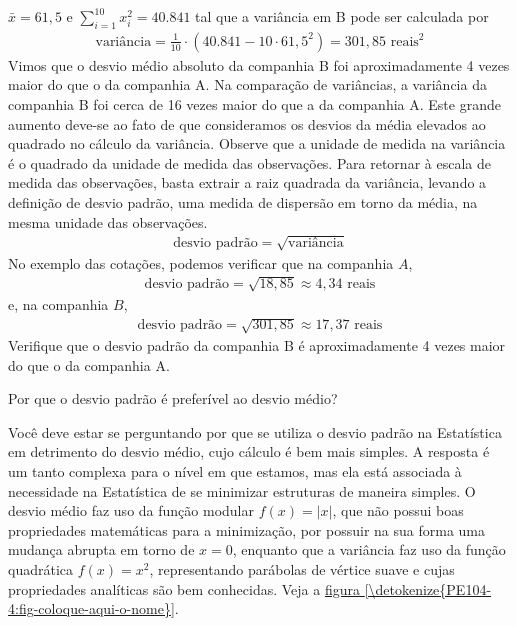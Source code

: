 {{{\(\bar{x}=61,5\) e \(\displaystyle{\sum^{10}_{i=1}} x^2_i=40.841\) tal que a variância em B pode ser calculada por
\begin{equation*}
\begin{split}\text{variância}=\frac{1}{10}\cdot (40.841-10\cdot 61,5^2)=301,85\text{ reais}^2\end{split}
\end{equation*}
Vimos que o desvio médio absoluto da companhia B foi aproximadamente 4 vezes maior do que o da companhia A. Na comparação de variâncias, a variância da companhia B foi cerca de 16 vezes maior do que a da companhia A. Este grande aumento deve-se ao fato de que consideramos os desvios da média elevados ao quadrado no cálculo da variância. Observe que a unidade de medida na variância é o quadrado da unidade de medida das observações. Para retornar à escala de medida das observações, basta extrair a raiz quadrada da variância, levando a definição de desvio padrão, uma medida de dispersão em torno da média, na mesma unidade das observações.
\begin{equation*}
\begin{split}\text{desvio padrão}=\sqrt{\text{variância}}\end{split}
\end{equation*}
No exemplo das cotações, podemos verificar que na companhia $A$,
\begin{equation*}
\begin{split}\text{desvio padrão}=\sqrt{18,85} \approx 4,34 \text{ reais}\end{split}
\end{equation*}
e, na companhia $B$,
\begin{equation*}
\begin{split}\text{desvio padrão}=\sqrt{301,85}\approx 17,37\text{ reais}\end{split}
\end{equation*}
Verifique que o desvio padrão da companhia B é aproximadamente 4 vezes maior do que o da companhia A.

\begin{observation}{Por que o desvio padrão é preferível ao desvio médio?}

Você deve estar se perguntando por que se utiliza o desvio padrão na Estatística em detrimento do desvio médio, cujo cálculo é bem mais simples. A resposta é um tanto complexa para o nível em que estamos, mas ela está associada à necessidade na Estatística de se minimizar estruturas de maneira simples. O desvio médio faz uso da função modular \(f(x)=|x|\), que não possui boas propriedades matemáticas para a minimização, por possuir na sua forma uma mudança abrupta em torno de \(x=0\),  enquanto que a variância faz uso da função quadrática \(f(x)=x^2\), representando parábolas de vértice suave e cujas propriedades analíticas são bem conhecidas. Veja a \hyperref[\detokenize{PE104-4:fig-coloque-aqui-o-nome}]{figura \ref{\detokenize{PE104-4:fig-coloque-aqui-o-nome}}}.


\end{observation}}}}
